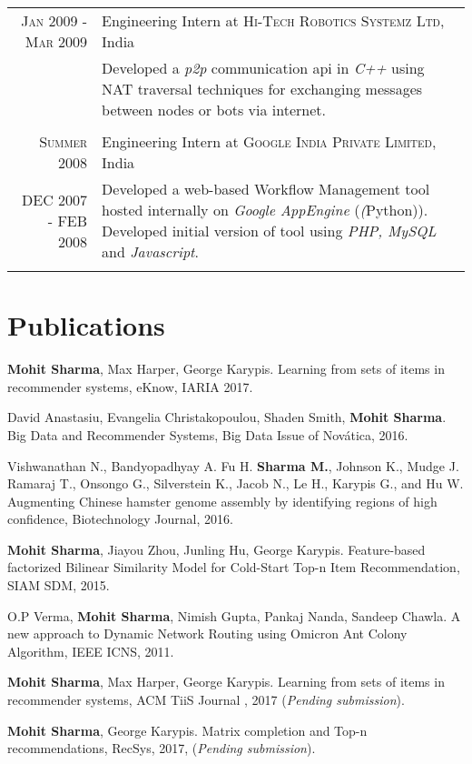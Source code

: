 \documentclass[a4paper,10pt]{article}
\begin{document}
\begin{tabular}{r|p{11cm}}
  \textsc{Jan 2009 - Mar 2009} & Engineering Intern at \textsc{Hi-Tech Robotics
                 Systemz Ltd}, India \\
                 &\footnotesize{ Developed a \emph{p2p} communication api in
                 \emph{C++}
                 using NAT traversal techniques for exchanging messages between
               nodes or bots via internet.} \\\multicolumn{2}{c}{} \\

  \textsc{Summer 2008} & Engineering Intern at \textsc{Google India Private
             Limited}, India \\
             DEC 2007 - FEB 2008  &\footnotesize{ Developed a web-based Workflow Management
           tool hosted internally on \emph{Google AppEngine} (\emph(Python)).
       Developed initial version of tool using \emph{PHP, MySQL} and \emph{
     Javascript}.} \\\multicolumn{2}{c}{} \\
  
\end{tabular}

\section{Publications}
\begin{description}

  \item \textbf{Mohit Sharma}, Max Harper, George Karypis. Learning from sets of items in
    recommender systems, eKnow, IARIA 2017. 
  \item David Anastasiu, Evangelia Christakopoulou, Shaden Smith, \textbf{Mohit
    Sharma}. Big Data and Recommender Systems, Big Data Issue of Novática, 2016.
  \item Vishwanathan N., Bandyopadhyay A. Fu H. \textbf{Sharma M.},
    Johnson K., Mudge J. Ramaraj T., Onsongo G., Silverstein K., Jacob N., Le
    H., Karypis G., and Hu W. Augmenting Chinese hamster genome assembly by identifying
    regions of high confidence, Biotechnology Journal, 2016.
  \item \textbf{Mohit Sharma}, Jiayou Zhou, Junling Hu, George Karypis. Feature-based factorized Bilinear Similarity Model for
  Cold-Start Top-n Item Recommendation, SIAM SDM, 2015.
  \item O.P Verma, \textbf{Mohit Sharma}, Nimish Gupta, Pankaj Nanda, Sandeep
    Chawla. A new approach to Dynamic Network Routing using Omicron
  Ant Colony Algorithm, IEEE ICNS, 2011. 

  \item \textbf{Mohit Sharma}, Max Harper, George Karypis. Learning from sets of items in
    recommender systems, ACM TiiS Journal , 2017 (\textit{Pending submission}).
  \item \textbf{Mohit Sharma}, George Karypis. Matrix completion and Top-n
  recommendations, RecSys, 2017, (\textit{Pending submission}).


\end{description}
\end{document}
